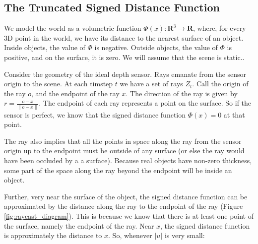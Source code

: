 \documentclass[10pt,twocolumn,letterpaper]{article}
\begin{document}
\subsection{The Truncated Signed Distance Function}
We model the world as a volumetric function $\Phi(x) : \mathbf{R}^3 \to
\mathbf{R}$, where, for every 3D point in the world, we have its distance to the
nearest surface of an object. Inside objects, the value of $\Phi$ is negative.
Outside objects, the value of $\Phi$ is positive, and on the surface, it is
zero. We will assume that the scene is static..

Consider the geometry of the ideal depth sensor. Rays emanate from the sensor
origin to the scene. At each timstep $t$ we have a set of rays $Z_t$. Call the
origin of the ray $o$, and the endpoint of the ray $x$. The direction of the
ray is given by $r = \frac{o - x}{\|o - x\|}$. The endpoint of each ray
represents a point on the surface. So if  the sensor is perfect, we know that
the signed distance function $\Phi(x) = 0$ at that point.

The ray also implies that all the points in space along the ray from the sensor
origin up to the endpoint must be outside of any surface (or else the ray would
have been occluded by a a surface). Because real objects have non-zero
thickness, some part of the space along the ray beyond the endpoint will be
inside an object.

Further, very near the surface of the object, the signed distance function can
be approximated by the distance along the ray to the endpoint of  the ray
(Figure \ref{fig:raycast_diagram}). This is because we know that there is at
least one point of the surface, namely the endpoint of the ray.  Near $x$, the
signed distance function is approximately the distance to $x$. So, whenever
$|u|$ is very small:
\end{document}
